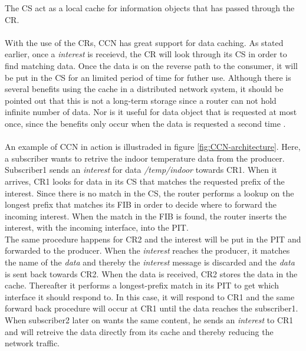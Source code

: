 The CS act as a local cache for information objects that has passed through the CR.
\\\\
With the use of the CRs, CCN has great support for data caching. As stated earlier, once a \textit{interest} is receievd, the CR will look through its CS in order to find matching data. Once the data is on the reverse path to the consumer, it will be put in the CS for an limited period of time for futher use. Although there is several benefits using the cache in a distributed network system, it should be pointed out that this is not a long-term storage since a router can not hold infinite number of data. Nor is it useful for data object that is requested at most once, since the benefits only occur when the data is requested a second time \cite{Ahlgreniot}\cite{Ahlgren2012}. %
\\\\
An example of CCN in action is illustraded in figure \ref{fig:CCN-architecture}. Here, a subscriber wants to retrive the indoor temperature data from the producer.
Subscriber1 sends an \textit{interest} for data \textit{/temp/indoor} towards CR1. When it arrives, CR1 looks for data in its CS that matches the requested prefix of the interest. Since there is no match in the CS, the router performs a lookup on the longest prefix that matches its FIB in order to decide where to forward the incoming interest. When the match in the FIB is found, the router inserts the interest, with the incoming interface, into the PIT.\\
The same procedure happens for CR2 and the interest will be put in the PIT and forwarded to the producer. When the \textit{interest} reaches the producer, it matches the name of the \textit{data} and thereby the \textit{interest} message is discarded and the \textit{data} is sent back towards CR2. When the data is received, CR2 stores the data in the cache. Thereafter it performs a longest-prefix match in its PIT to get which interface it should respond to. In this case, it will respond to CR1 and the same forward back procedure will occur at CR1 until the data reaches the subscriber1.\\
When subscriber2 later on wants the same content, he sends an \textit{interest} to CR1 and will retreive the data directly from its cache and thereby reducing the network traffic.



